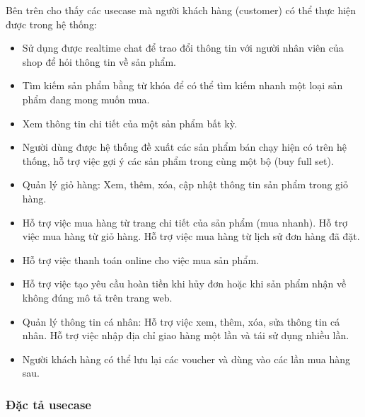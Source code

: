 Bên trên cho thấy các usecase mà người khách hàng (customer) có thể thực hiện được trong hệ thống:
\begin{itemize}
  \item Sử dụng được realtime chat để trao đổi thông tin với người nhân viên của shop để hỏi thông tin về sản phẩm.
  \item Tìm kiếm sản phẩm bằng từ khóa để có thể tìm kiếm nhanh một loại sản phẩm đang mong muốn mua.
  \item Xem thông tin chi tiết của một sản phẩm bất kỳ.
  \item Người dùng được hệ thống đề xuất các sản phẩm bán chạy hiện có trên hệ thống, hỗ trợ việc gợi ý các sản phẩm trong cùng một bộ (buy full set).
  \item Quản lý giỏ hàng: Xem, thêm, xóa, cập nhật thông tin sản phẩm trong giỏ hàng.
  \item Hỗ trợ việc mua hàng từ trang chi tiết của sản phẩm (mua nhanh). Hỗ trợ việc mua hàng từ giỏ hàng. Hỗ trợ việc mua hàng từ lịch sử đơn hàng đã đặt.
  \item Hỗ trợ việc thanh toán online cho việc mua sản phẩm.
  \item Hỗ trợ việc tạo yêu cầu hoàn tiền khi hủy đơn hoặc khi sản phẩm nhận về không đúng mô tả trên trang web.
  \item Quản lý thông tin cá nhân: Hỗ trợ việc xem, thêm, xóa, sửa thông tin cá nhân. Hỗ trợ việc nhập địa chỉ giao hàng một lần và tái sử dụng nhiều lần.
  \item Người khách hàng có thể lưu lại các voucher và dùng vào các lần mua hàng sau.
\end{itemize}

\subsubsection{Đặc tả usecase}


